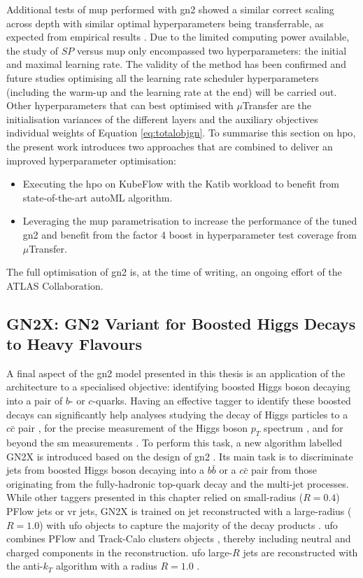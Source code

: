 Additional tests of \gls{mup} performed with \gls{gn2} showed a similar correct scaling across depth with similar optimal hyperparameters being transferrable, as expected from empirical results \cite{yang2021tuning}. Due to the limited computing power available, the study of $SP$ versus \gls{mup} only encompassed two hyperparameters: the initial and maximal learning rate. The validity of the method has been confirmed and future studies optimising all the learning rate scheduler hyperparameters (including the warm-up and the learning rate at the end) will be carried out. Other hyperparameters that can best optimised with $\mu$Transfer are the initialisation variances of the different layers and the auxiliary objectives individual weights of Equation \ref{eq:totalobjgn}. To summarise this section on \gls{hpo}, the present work introduces two approaches that are combined to deliver an improved hyperparameter optimisation:
\begin{itemize}
  \item Executing the \gls{hpo} on KubeFlow with the Katib workload to benefit from state-of-the-art autoML algorithm.
  \item Leveraging the \gls{mup} parametrisation to increase the performance of the tuned \gls{gn2} and benefit from the factor 4 boost in hyperparameter test coverage from $\mu$Transfer.
\end{itemize}
The full optimisation of \gls{gn2} is, at the time of writing, an ongoing effort of the ATLAS Collaboration.

\subsection{GN2X: GN2 Variant for Boosted Higgs Decays to Heavy Flavours}\label{chap-GN2X}
A final aspect of the \gls{gn2} model presented in this thesis is an application of the architecture to a specialised objective: identifying boosted Higgs boson decaying into a pair of $b$- or $c$-quarks. Having an effective tagger to identify these boosted decays can significantly help analyses studying the decay of Higgs particles to a $c\bar{c}$ pair \cite{ATLAS:2022ers}, for the precise measurement of the Higgs boson $p_T$ spectrum \cite{PhysRevD.105.092003}, and for beyond the \gls{sm} measurements \cite{ATLAS:2023azi}. To perform this task, a new algorithm labelled GN2X is introduced based on the design of \gls{gn2} \cite{ATL-PHYS-PUB-2023-021}. Its main task is to discriminate jets from boosted Higgs boson decaying into a $b\bar{b}$ or a $c\bar{c}$ pair from those originating from the fully-hadronic top-quark decay and the multi-jet processes. While other taggers presented in this chapter relied on small-radius ($R=0.4$) PFlow jets or \gls{vr} jets, GN2X is trained on jet reconstructed with a large-radius ($R=1.0$) with \gls{ufo} objects to capture the majority of the decay products \cite{atlasLARGERJet}. \gls{ufo} combines PFlow \cite{atlasPFLOW} and Track-Calo clusters objects \cite{ATL-PHYS-PUB-2017-015}, thereby including neutral and charged components in the reconstruction. \gls{ufo} large-$R$ jets are reconstructed with the anti-$k_T$ algorithm with a radius $R = 1.0$ \cite{Cacciari:2008gp}. \\

